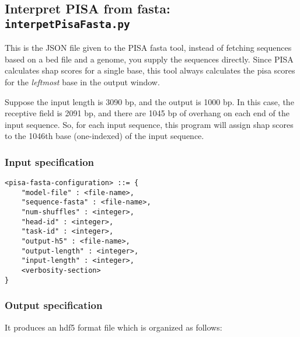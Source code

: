 \documentclass{article}
\begin{document}
\newpage

\subsection{Interpret PISA from fasta: \texttt{interpetPisaFasta.py}}

This is the JSON file given to the PISA fasta tool, instead of fetching sequences based on a bed file and a genome, you supply the sequences directly.
Since PISA calculates shap scores for a single base, this tool always calculates the pisa scores for the \emph{leftmost} base in the output window.

Suppose the input length is 3090 bp, and the output is 1000 bp.
In this case, the receptive field is 2091 bp, and there are 1045 bp of overhang on each end of the input sequence.
So, for each input sequence, this program will assign shap scores to the 1046th base (one-indexed) of the input sequence.

\subsubsection{Input specification}
\begin{lstlisting}
<pisa-fasta-configuration> ::= {
    "model-file" : <file-name>,
    "sequence-fasta" : <file-name>,
    "num-shuffles" : <integer>,
    "head-id" : <integer>,
    "task-id" : <integer>,
    "output-h5" : <file-name>,
    "output-length" : <integer>,
    "input-length" : <integer>,
    <verbosity-section>
}
\end{lstlisting}

\subsubsection{Output specification}

It produces an hdf5 format file which is organized as follows:
\end{document}
